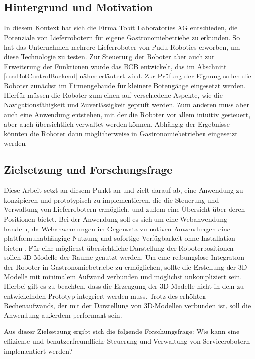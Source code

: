 \subsection{Hintergrund und Motivation}\label{sec:BackgroundAndMotivation}
In diesem Kontext hat sich die Firma Tobit Laboratories AG entschieden, die Potenziale von Lieferrobotern für eigene Gastronomiebetriebe zu erkunden. So hat das Unternehmen mehrere Lieferroboter von Pudu Robotics erworben, um diese Technologie zu testen. Zur Steuerung der Roboter aber auch zur Erweiterung der Funktionen wurde das \ac{BCB} entwickelt, das im Abschnitt \ref{sec:BotControlBackend} näher erläutert wird. Zur Prüfung der Eignung sollen die Roboter zunächst im Firmengebäude für kleinere Botengänge eingesetzt werden. Hierfür müssen die Roboter zum einen auf verschiedene Aspekte, wie die Navigationsfähigkeit und Zuverlässigkeit geprüft werden. Zum anderen muss aber auch eine Anwendung entstehen, mit der die Roboter vor allem intuitiv gesteuert, aber auch übersichtlich verwaltet werden können. Abhängig der Ergebnisse könnten die Roboter dann möglicherweise in Gastronomiebetrieben eingesetzt werden.

\subsection{Zielsetzung und Forschungsfrage}\label{sec:ResearchQuestion}
Diese Arbeit setzt an diesem Punkt an und zielt darauf ab, eine Anwendung zu konzipieren und prototypisch zu implementieren, die die Steuerung und Verwaltung von Lieferrobotern ermöglicht und zudem eine Übersicht über deren Positionen bietet. Bei der Anwendung soll es sich um eine Webanwendung handeln, da Webanwendungen im Gegensatz zu nativen Anwendungen eine plattformunabhängige Nutzung und sofortige Verfügbarkeit ohne Installation bieten \cite{AWSWebApp}. Für eine möglichst übersichtliche Darstellung der Roboterpositionen sollen 3D-Modelle der Räume genutzt werden. Um eine reibungslose Integration der Roboter in Gastronomiebetriebe zu ermöglichen, sollte die Erstellung der 3D-Modelle mit minimalem Aufwand verbunden und möglichst unkompliziert sein. Hierbei gilt es zu beachten, dass die Erzeugung der 3D-Modelle nicht in dem zu entwickelnden Prototyp integriert werden muss. Trotz des erhöhten Rechenaufwands, der mit der Darstellung von 3D-Modellen verbunden ist, soll die Anwendung außerdem performant sein.

Aus dieser Zielsetzung ergibt sich die folgende Forschungsfrage: Wie kann eine effiziente und benutzerfreundliche Steuerung und Verwaltung von Servicerobotern implementiert werden?

